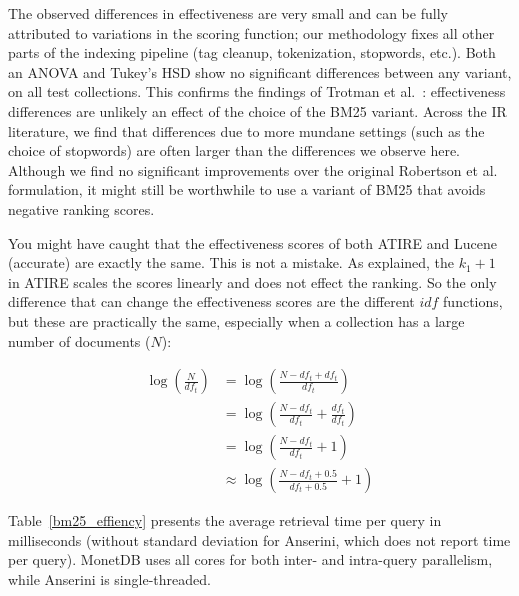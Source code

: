 The observed differences in effectiveness are very small and can be fully attributed to variations in the scoring function; our methodology fixes all other parts of the indexing pipeline (tag cleanup, tokenization, stopwords, etc.). Both an ANOVA and Tukey’s HSD show no significant differences between any variant, on all test collections. This confirms the findings of Trotman et al.~\cite{trotman-bm25}: effectiveness differences are unlikely an effect of the choice of the BM25 variant. Across the IR literature, we find that differences due to more mundane settings (such as the choice of stopwords) are often larger than the differences we observe here. Although we find no significant improvements over the original Robertson et al.~\cite{bm25-robertson} formulation, it might still be worthwhile to use a variant of BM25 that avoids negative ranking scores.

You might have caught that the effectiveness scores of both ATIRE and Lucene (accurate) are exactly the same. This is not a mistake. As explained, the $k_1+1$ in ATIRE scales the scores linearly and does not effect the ranking. So the only difference that can change the effectiveness scores are the different $idf$ functions, but these are practically the same, especially when a collection has a large number of documents ($N$):

\begin{align}
	\log\left(\frac{N}{df_t}\right) &= \log\left(\frac{N-df_t+df_t}{df_t}\right) \\
									&= \log\left(\frac{N-df_t}{df_t} + \frac{df_t}{df_t}\right) \\
									&= \log\left(\frac{N-df_t}{df_t} + 1\right) \\
									&\approx \log\left(\frac{N-df_t+0.5}{df_t+0.5} + 1\right)
\end{align}

Table~\ref{bm25_effiency} presents the average retrieval time per query in milliseconds (without standard deviation for Anserini, which does not report time per query). MonetDB uses all cores for both inter- and intra-query parallelism, while Anserini is single-threaded.

